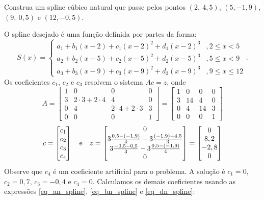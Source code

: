 \begin{ex}Construa um spline cúbico natural que passe pelos pontos $(2,~4,5)$, $(5,-1,9)$, $(9,~0,5)$ e $(12,-0,5)$.
\end{ex}
\begin{sol}
O spline desejado é uma função definida por partes da forma:
\begin{equation}
S(x)=\left\{\begin{array}{ll}
    a_1+b_1(x-2)+c_1(x-2)^2+d_1(x-2)^3 &, 2\leq x <5\\
    a_2+b_2(x-5)+c_2(x-5)^2+d_2(x-5)^3 &, 5\leq x <9\\
    a_3+b_3(x-9)+c_3(x-9)^2+d_3(x-9)^3 &, 9\leq x \leq 12
\end{array}\right..  
\end{equation}
Os coeficientes $c_1$, $c_2$ e $c_3$ resolvem o sistema $Ac = z$, onde
\begin{equation*}
A = \begin{bmatrix}
  1 &0&0&0 \\
  3&2\cdot 3+2\cdot 4&4&0\\
  0&4&2\cdot 4+2\cdot 3&3\\
  0&0&0&1
\end{bmatrix} = \begin{bmatrix}
  1 &0&0&0 \\
  3&14&4&0\\
  0&4&14&3\\
  0&0&0&1
\end{bmatrix}  
\end{equation*}
\begin{equation*}
c = \begin{bmatrix}
c_1\\
c_2\\
c_3\\
c_4
\end{bmatrix} \quad \hbox{e}\quad
z = \begin{bmatrix}
0\\
3\frac{0,5-(-1,9)}{4}-3\frac{(-1,9)-4,5}{3}\\
3\frac{-0,5-0,5}{3}-3\frac{0,5-(-1,9)}{4}\\
0
\end{bmatrix} = \begin{bmatrix}
0\\
8,2\\
-2,8\\
0
\end{bmatrix}  
\end{equation*}
Observe que $c_4$ é um coeficiente artificial para o problema. A solução é  $c_1=0$, $c_2=0,7$, $c_3=-0,4$ e $c_4=0$. Calculamos os demais coeficientes usando as expressões \eqref{eq_an_spline}, \eqref{eq_bn_spline} e \eqref{eq_dn_spline}:

\end{sol}
